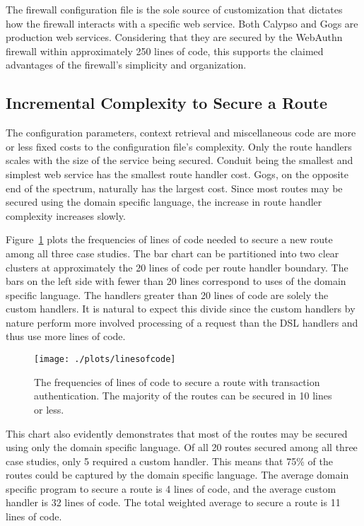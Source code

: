 The firewall configuration file is the sole source of customization that dictates how the firewall interacts with a specific web service. Both Calypso and Gogs are production web services. Considering that they are secured by the WebAuthn firewall within approximately 250 lines of code, this supports the claimed advantages of the firewall's simplicity and organization. 

\subsection{Incremental Complexity to Secure a Route}

The configuration parameters, context retrieval and miscellaneous code are more or less fixed costs to the configuration file's complexity. Only the route handlers scales with the size of the service being secured. Conduit being the smallest and simplest web service has the smallest route handler cost. Gogs, on the opposite end of the spectrum, naturally has the largest cost. Since most routes may be secured using the domain specific language, the increase in route handler complexity increases slowly.

Figure~\ref{Fig:IncrementalComplexity} plots the frequencies of lines of code needed to secure a new route among all three case studies. The bar chart can be partitioned into two clear clusters at approximately the 20 lines of code per route handler boundary. The bars on the left side with fewer than 20 lines correspond to uses of the domain specific language. The handlers greater than 20 lines of code are solely the custom handlers. It is natural to expect this divide since the custom handlers by nature perform more involved processing of a request than the DSL handlers and thus use more lines of code.


\begin{figure}[h]
  \centering
  \texttt{[image: ./plots/linesofcode]}
  \caption{The frequencies of lines of code to secure a route with transaction authentication. The majority of the routes can be secured in 10 lines or less.}
  \label{Fig:IncrementalComplexity}
\end{figure}

This chart also evidently demonstrates that most of the routes may be secured using only the domain specific language. Of all 20 routes secured among all three case studies, only 5 required a custom handler. This means that 75\% of the routes could be captured by the domain specific language. The average domain specific program to secure a route is 4 lines of code, and the average custom handler is 32 lines of code. The total weighted average to secure a route is 11 lines of code.

